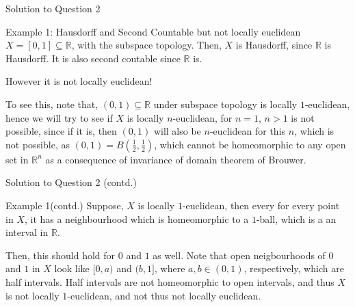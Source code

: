 \documentclass{beamer}
\begin{document}
\begin{frame}{Solution to Question 2}
\begin{exampleblock}{Example 1: Hausdorff and Second Countable but not locally euclidean}
$\displaystyle X=[ 0,1] \subseteq \mathbb{R}$, with the subspace topology. Then, $\displaystyle X$ is Hausdorff, since $\displaystyle \mathbb{R}$ is Hausdorff. It is also second coutable since $\displaystyle \mathbb{R}$ is. 

However it is not locally euclidean! 

To see this, note that, $\displaystyle ( 0,1) \subseteq \mathbb{R}$ under subspace topology is locally $\displaystyle 1$-euclidean, hence we will try to see if $\displaystyle X$ is locally $\displaystyle n$-euclidean, for $\displaystyle n=1$, $\displaystyle n >1$ is not possible, since if it is, then $\displaystyle ( 0,1)$ will also be $\displaystyle n$-euclidean for this $\displaystyle n$, which is not possible, as $\displaystyle ( 0,1) =B\left(\frac{1}{2} ,\frac{1}{2}\right)$, which cannot be homeomorphic to any open set in $\displaystyle \mathbb{R}^{n}$ as a consequence of invariance of domain theorem of Brouwer.

\end{exampleblock}
\end{frame}
\begin{frame}{Solution to Question 2 (contd.)}
\begin{exampleblock}{Example 1(contd.)}
Suppose, $\displaystyle X$ is locally $\displaystyle 1$-euclidean, then every for every point in $\displaystyle X$, it has a neighbourhood which is homeomorphic to a $\displaystyle 1$-ball, which is a an interval in $\displaystyle \mathbb{R}$. 

Then, this should hold for $\displaystyle 0$ and $\displaystyle 1$ as well. Note that open neigbourhoods of $\displaystyle 0$ and $\displaystyle 1$ in $\displaystyle X$ look like $\displaystyle [ 0,a)$ and $\displaystyle ( b,1]$, where $\displaystyle a,b\in ( 0,1)$, respectively, which are half intervals. Half intervals are not homeomorphic to open intervals, and thus $\displaystyle X$ is not locally $\displaystyle 1$-euclidean, and not thus not locally euclidean. 
\end{exampleblock}  
\end{frame}
\end{document}
